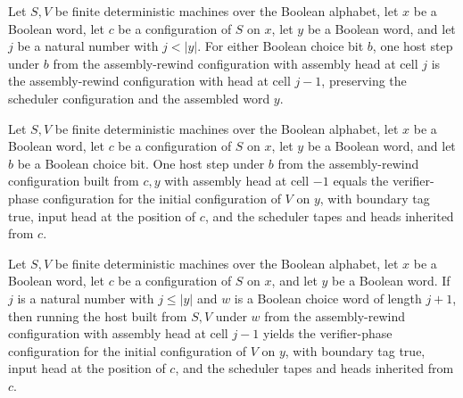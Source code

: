 \begin{lemma}
\label{Complexity.b2_ready_step}
\leanok
{}
Let $S,V$ be finite deterministic machines over the Boolean alphabet, let $x$ be a
Boolean word, let $c$ be a configuration of $S$ on $x$, let $y$ be a Boolean word, and
let $j$ be a natural number with $j<|y|$. For either Boolean choice bit $b$, one host
step under $b$ from the assembly-rewind configuration with assembly head at cell $j$ is
the assembly-rewind configuration with head at cell $j-1$, preserving the scheduler
configuration and the assembled word $y$.
\end{lemma}

\begin{lemma}
\label{Complexity.b2_ready_done}
\leanok
{}
Let $S,V$ be finite deterministic machines over the Boolean alphabet, let $x$ be a
Boolean word, let $c$ be a configuration of $S$ on $x$, let $y$ be a Boolean word, and
let $b$ be a Boolean choice bit. One host step under $b$ from the assembly-rewind
configuration built from $c,y$ with assembly head at cell $-1$ equals the verifier-phase
configuration for the initial configuration of $V$ on $y$, with boundary tag true, input
head at the position of $c$, and the scheduler tapes and heads inherited from $c$.
\end{lemma}

\begin{lemma}
\label{Complexity.b2_ready_run}
\leanok
{}
Let $S,V$ be finite deterministic machines over the Boolean alphabet, let $x$ be a
Boolean word, let $c$ be a configuration of $S$ on $x$, and let $y$ be a Boolean word.
If $j$ is a natural number with $j\le |y|$ and $w$ is a Boolean choice word of length
$j+1$, then running the host built from $S,V$ under $w$ from the assembly-rewind
configuration with assembly head at cell $j-1$ yields the verifier-phase configuration
for the initial configuration of $V$ on $y$, with boundary tag true, input head at the
position of $c$, and the scheduler tapes and heads inherited from $c$.
\end{lemma}

